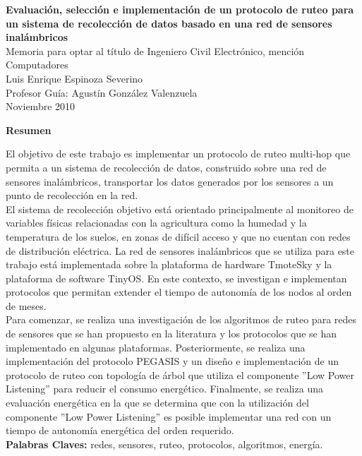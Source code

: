 \newpage
\thispagestyle{empty}
\begin{center}
 \Large \textbf{Evaluación, selección e implementación de un protocolo de ruteo para un sistema de recolección de datos basado en una red de sensores inalámbricos}\\

\normalsize Memoria para optar al título de Ingeniero Civil Electrónico, mención Computadores \\
\normalsize Luis Enrique Espinoza Severino \\
\normalsize Profesor Guía: Agustín González Valenzuela \\
\normalsize Noviembre 2010

\Large \textbf{Resumen}

\end{center}
\normalsize


El objetivo de este trabajo es implementar un protocolo de ruteo multi-hop que permita a un sistema de recolección de datos, construido sobre una red de sensores inalámbricos, transportar los datos generados por los sensores a un punto de recolección en la red.\\ 

El sistema de recolección objetivo está orientado principalmente al monitoreo de variables físicas relacionadas con la agricultura como la humedad y la temperatura de los suelos, en zonas de difícil acceso y que no cuentan con redes de distribución eléctrica. La red de sensores inalámbricos que se utiliza para este trabajo está implementada sobre la plataforma de hardware TmoteSky y la plataforma de software TinyOS. En este contexto, se investigan e implementan protocolos que permitan extender el tiempo de autonomía de los nodos al orden de meses.\\
 
Para comenzar, se realiza una investigación de los algoritmos de ruteo para redes de sensores que se han propuesto en la literatura y los protocolos que se han implementado en algunas plataformas. Posteriormente, se realiza una implementación del protocolo PEGASIS y un diseño e implementación de un protocolo de ruteo con topología de árbol que utiliza el componente ''Low Power Listening'' para reducir el consumo energético. Finalmente, se realiza una evaluación energética en la que se determina que con la utilización del componente ''Low Power Listening'' es posible implementar una red con un tiempo de autonomía energética del orden requerido.\\

\textbf{Palabras Claves:} redes, sensores, ruteo, protocolos, algoritmos, energía.
